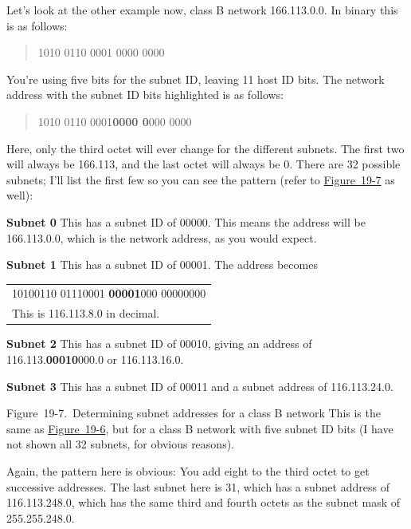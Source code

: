 Let's look at the other example now, class B network 166.113.0.0.
In binary this is as follows:
\begin{quote}
1010 0110 0001 0000 0000
\end{quote}

You're using five bits for the subnet ID, leaving 11 host ID bits.
The network address with the subnet ID bits highlighted is as follows:
\begin{quote}
1010 0110 0001\quad \textbf{0000 0}000 0000
\end{quote}

Here, only the third octet will ever change for the different subnets.
The first two will always be 166.113, and the last octet will always be
0. There are 32 possible subnets; I'll list the first few so you can see
the pattern (refer to
\protect\hyperlink{ch19s04.htmlux5cux23determining_subnet_addresses_for_a-id001}{Figure~19-7}
as well):

{\textbf{Subnet 0}} This has a subnet ID of 00000. This means the
address will be 166.113.0.0, which is the network address, as you would
expect.

{\textbf{Subnet 1}} This has a subnet ID of 00001. The address becomes

\begin{longtable}[]{@{}l@{}}
\toprule
\endhead
10100110 01110001 {\textbf{00001}}000 00000000\tabularnewline
This is 116.113.8.0 in decimal.\tabularnewline
\bottomrule
\end{longtable}

{\textbf{Subnet 2}} This has a subnet ID of 00010, giving an address of
116.113.{\textbf{00010}}000.0 or 116.113.16.0.

{\textbf{Subnet 3}} This has a subnet ID of 00011 and a subnet address
of 116.113.24.0.

 

 

Figure~19-7.~Determining subnet addresses for a class B network This is
the same as
\protect\hyperlink{ch19s04.htmlux5cux23determining_subnet_addresses_for_a_class}{Figure~19-6},
but for a class B network with five subnet ID bits (I have not shown all
32 subnets, for obvious reasons).

 Again, the
pattern here is obvious: You add eight to the third octet to get
successive addresses. The last subnet here is 31, which has a subnet
address of 116.113.248.0, which has the same third and fourth octets as
the subnet mask of 255.255.248.0.





